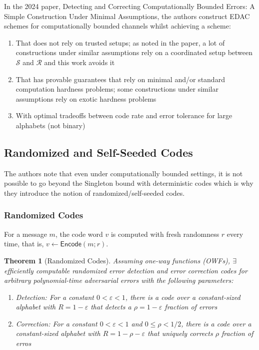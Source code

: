 \documentclass[12pt]{article}%
\newtheorem{theorem}{Theorem}
\begin{document}
In the 2024 paper, Detecting and Correcting Computationally Bounded Errors:
A Simple Construction Under Minimal Assumptions, the authors construct EDAC schemes for computationally bounded channels whilst achieving a scheme: \begin{enumerate}
    \item That does not rely on trusted setups; as noted in the paper, a lot of constructions under similar assumptions rely on a coordinated setup between $\mathcal{S}$ and $\mathcal{R}$ and this work avoids it
    \item That has provable guarantees that rely on minimal and/or standard computation hardness problems; some constructions under similar assumptions rely on exotic hardness problems 
    \item With optimal tradeoffs between code rate and error tolerance for large alphabets (not binary)
\end{enumerate}

\subsection{Randomized and Self-Seeded Codes}

The authors note that even under computationally bounded settings, it is not possible to go beyond the Singleton bound with deterministic codes which is why they introduce the notion of randomized/self-seeded codes. 

\subsubsection{Randomized Codes}
For a message $m$, the code word $v$ is computed with fresh randomness $r$ every time, that is, $v \xleftarrow{}\textsf{Encode}(m; r)$. 

\begin{theorem}[Randomized Codes]
    Assuming one-way functions (OWFs), $\exists$ efficiently computable randomized error detection and error correction codes for arbitrary polynomial-time adversarial errors with the following parameters: \begin{enumerate}
        \item Detection: For a constant $0 < \varepsilon < 1$, there is a code over a constant-sized alphabet with $R = 1 - \varepsilon$ that detects a $\rho = 1- \varepsilon$ fraction of errors
        \item Correction: For a constant $0 < \varepsilon < 1$ and $0 \leq \rho < 1/2 $, there is a code over a constant-sized alphabet with $R = 1 - \rho - \varepsilon$ that uniquely corrects $\rho$ fraction of erros
    \end{enumerate}
\end{theorem}
\end{document}
